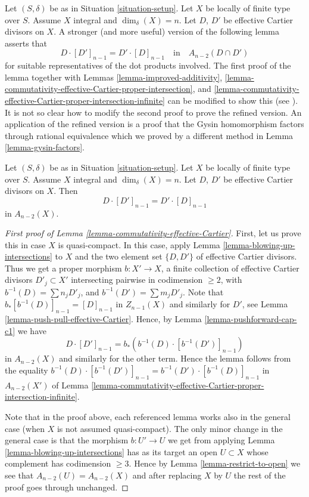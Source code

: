 \noindent
Let $(S, \delta)$ be as in Situation \ref{situation-setup}.
Let $X$ be locally of finite type over $S$. Assume $X$ integral
and $\dim_\delta(X) = n$. Let $D$, $D'$ be effective Cartier divisors on $X$.
A stronger (and more useful) version of the following lemma
asserts that
$$
D \cdot [D']_{n - 1} = D' \cdot [D]_{n - 1}
\quad\text{in}\quad
A_{n - 2}(D \cap D')
$$
for suitable representatives of the dot products involved. The first proof
of the lemma together with
Lemmas \ref{lemma-improved-additivity},
\ref{lemma-commutativity-effective-Cartier-proper-intersection}, and
\ref{lemma-commutativity-effective-Cartier-proper-intersection-infinite}
can be modified to show this (see \cite{F}). It is
not so clear how to modify the second proof to prove the refined
version. An application of the refined version is a proof that the
Gysin homomorphism factors through rational equivalence which we proved
by a different method in Lemma \ref{lemma-gysin-factors}.

\begin{lemma}
\label{lemma-commutativity-effective-Cartier}
Let $(S, \delta)$ be as in Situation \ref{situation-setup}.
Let $X$ be locally of finite type over $S$.
Assume $X$ integral and $\dim_\delta(X) = n$.
Let $D$, $D'$ be effective Cartier divisors on $X$.
Then
$$
D \cdot [D']_{n - 1} = D' \cdot [D]_{n - 1}
$$
in $A_{n - 2}(X)$.
\end{lemma}

\begin{proof}[First proof of Lemma \ref{lemma-commutativity-effective-Cartier}]
First, let us prove this in case $X$ is quasi-compact.
In this case, apply Lemma \ref{lemma-blowing-up-intersections} to $X$ and the
two element set $\{D, D'\}$ of effective Cartier divisors.
Thus we get a proper morphism $b : X' \to X$,
a finite collection of effective Cartier
divisors $D'_j \subset X'$ intersecting pairwise in codimension $\geq 2$,
with $b^{-1}(D) = \sum n_j D'_j$, and $b^{-1}(D') = \sum m_j D'_j$.
Note that $b_*[b^{-1}(D)]_{n - 1} = [D]_{n - 1}$ in $Z_{n - 1}(X)$
and similarly for $D'$,
see Lemma \ref{lemma-push-pull-effective-Cartier}.
Hence, by Lemma \ref{lemma-pushforward-cap-c1} we have
$$
D \cdot [D']_{n - 1} = b_*\left(b^{-1}(D) \cdot [b^{-1}(D')]_{n - 1}\right)
$$
in $A_{n - 2}(X)$ and similarly for the other term. Hence the
lemma follows from the equality
$b^{-1}(D) \cdot [b^{-1}(D')]_{n - 1} = b^{-1}(D') \cdot [b^{-1}(D)]_{n - 1}$
in $A_{n - 2}(X')$ of Lemma
\ref{lemma-commutativity-effective-Cartier-proper-intersection-infinite}.

\medskip\noindent
Note that in the proof above, each referenced lemma works also
in the general case (when $X$ is not assumed quasi-compact). The
only minor change in the general case is that the morphism
$b : U' \to U$ we get from applying Lemma \ref{lemma-blowing-up-intersections}
has as its target
an open $U \subset X$ whose complement has codimension $\geq 3$.
Hence by Lemma \ref{lemma-restrict-to-open} we see that
$A_{n - 2}(U) = A_{n - 2}(X)$
and after replacing $X$ by $U$ the rest of the proof goes through
unchanged.
\end{proof}


